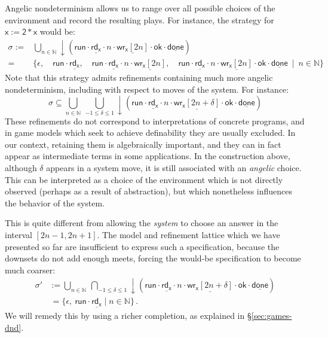 \documentclass[draft,11pt]{report}
\newcommand{\kw}[1]{\ensuremath{ \mathsf{#1} }}
\begin{document}
Angelic nondeterminism
allows us to range over all possible choices of the environment
and record the resulting plays.
For instance,
the strategy for $\kw{x := 2 * x}$
would be:
\begin{align*}
  \sigma := {} &
    \bigcup_{n \in \mathbb{N}} {\downarrow}(
      \kw{run} \cdot
      \underline{\kw{rd}_\kw{x}} \cdot n \cdot
      \underline{\kw{wr}_\kw{x}[2n]} \cdot \kw{ok} \cdot
      \underline{\kw{done}}) \\
        = {} & \{ \epsilon, \quad
        \kw{run} \cdot
        \underline{\kw{rd}_\kw{x}} , \quad
        \kw{run} \cdot
        \underline{\kw{rd}_\kw{x}} \cdot n \cdot
        \underline{\kw{wr}_\kw{x}[2n]} , \quad
        \kw{run} \cdot
        \underline{\kw{rd}_\kw{x}} \cdot n \cdot
        \underline{\kw{wr}_\kw{x}[2n]} \cdot \kw{ok} \cdot
        \underline{\kw{done}}
        \: \mid \: n \in \mathbb{N} \}
\end{align*}
Note that this strategy admits refinements
containing much more angelic nondeterminism,
including with respect to moves of the system.
For instance:
\[
  \sigma \subseteq
    \bigcup_{n \in \mathbb{N}} \:
    \bigcup_{-1 \le \delta \le 1}
    {\downarrow}(
      \kw{run} \cdot
      \underline{\kw{rd}_\kw{x}} \cdot n \cdot
      \underline{\kw{wr}_\kw{x}[2n + \delta]} \cdot \kw{ok} \cdot
      \underline{\kw{done}})
\]
These refinements do not correspond to interpretations
of concrete programs,
and in game models which seek to achieve definability
they are usually excluded.
In our context, retaining them is algebraically important,
and they can in fact appear as intermediate terms
in some applications.
In the construction above,
although $\delta$ appears in a system move,
it is still associated with an \emph{angelic} choice.
This can be interpreted as a choice of the environment
which is not directly observed
(perhaps as a result of abstraction),
but which nonetheless influences the behavior of the system.

This is quite different from allowing the \emph{system}
to choose an answer in the interval $[2n - 1, 2n + 1]$.
The model and refinement lattice which
we have presented so far are insufficient
to express such a specification,
because the downsets do not add enough meets,
forcing the would-be specification to become
much coarser:
\begin{align*}
  \sigma' &:=
    \bigcup_{n \in \mathbb{N}} \:
    \bigcap_{-1 \le \delta \le 1}
    {\downarrow}(
      \kw{run} \cdot
      \underline{\kw{rd}_\kw{x}} \cdot n \cdot
      \underline{\kw{wr}_\kw{x}[2n + \delta]} \cdot \kw{ok} \cdot
      \underline{\kw{done}}) \\
  & \, =
    \{ \epsilon,  \:
       \kw{run} \cdot \underline{\kw{rd}_\kw{x}}
       \mid n \in \mathbb{N} \} \,.
\end{align*}
We will remedy this by using a richer completion,
as explained in \S\ref{sec:games-dnd}.
\end{document}

